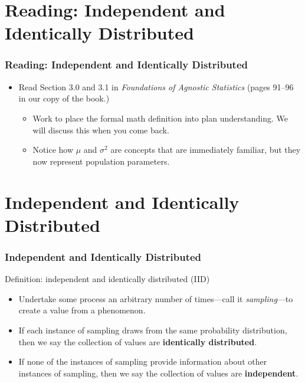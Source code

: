 \documentclass[12pt, block=fill]{beamer}
\begin{document}
\section{Reading: Independent and Identically Distributed}

\begin{frame}
  \frametitle{Reading: Independent and Identically Distributed}
  \begin{itemize}
  \item Read Section 3.0 and 3.1 in \textit{Foundations of Agnostic
      Statistics} (pages 91–96 in our copy of the book.)
    \begin{itemize}
      \item Work to place the formal math definition into plan
        understanding. We will discuss this when you come back.
      \item Notice how $\mu$ and $\sigma^{2}$ are concepts that are
        immediately familiar, but they now represent population
        parameters.
    \end{itemize} 
  \end{itemize}
\end{frame}
\section{Independent and Identically Distributed} 

\begin{frame}
  \frametitle{Independent and Identically Distributed}
  \begin{block}{Definition: independent and identically distributed (IID)}
    \begin{itemize}
    \item Undertake some process an arbitrary number of times—call
      it \textit{sampling}—to create a value from a phenomenon.
    \item If each instance of sampling draws from the same probability
      distribution, then we say the collection of values are
      \textbf{identically distributed}.
    \item If none of the instances of sampling provide information
      about other instances of sampling, then we say the collection of
      values are \textbf{independent}. 
    \end{itemize}
  \end{block}
\end{frame}
\end{document}
